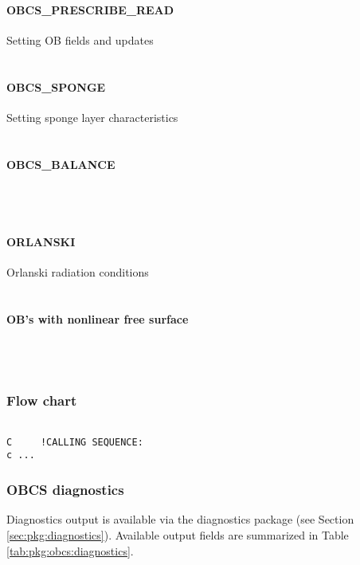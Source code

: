 \paragraph{OBCS\_PRESCRIBE\_READ} Setting OB fields and updates \\
%
~

\paragraph{OBCS\_SPONGE} Setting sponge layer characteristics \\
%
~

\paragraph{OBCS\_BALANCE} ~ \\
%
~

\paragraph{ORLANSKI} Orlanski radiation conditions \\
%
~

\paragraph{OB's with nonlinear free surface} ~ \\
%
~



\subsubsection{Flow chart
\label{sec:pkg:obcs:flowchart}}


{\footnotesize
\begin{verbatim}

C     !CALLING SEQUENCE:
c ...

\end{verbatim}
}


\subsubsection{OBCS diagnostics
\label{sec:pkg:obcs:diagnostics}}

Diagnostics output is available via the diagnostics package
(see Section \ref{sec:pkg:diagnostics}).
Available output fields are summarized in 
Table \ref{tab:pkg:obcs:diagnostics}.

